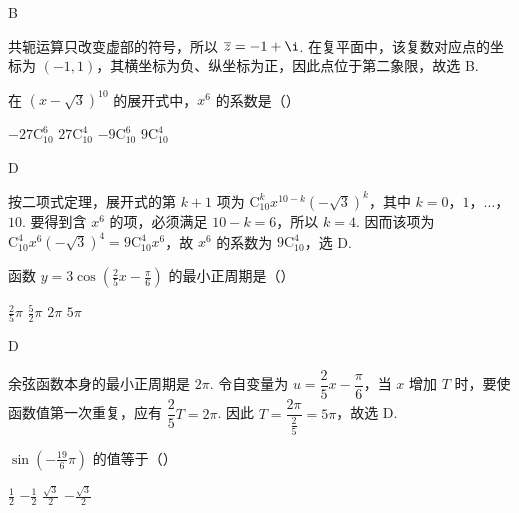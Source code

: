 \documentclass[UTF8,a4paper,oneside,11pt]{ctexbook}
\begin{document}
\begin{answer}
B
\end{answer}

\begin{solution}
共轭运算只改变虚部的符号，所以
\(\overline z=-1+\i\). 在复平面中，该复数对应点的坐标为 \((-1,1)\)，其横坐标为负、纵坐标为正，因此点位于第二象限，故选 B.
\end{solution}

\begin{problem}
在 \(\left(x-\sqrt{3}\right)^{10}\) 的展开式中，\(x^6\) 的系数是（\quad）

\choices
    {\(-27\mathrm C_{10}^6\)}
    {\(27\mathrm C_{10}^4\)}
    {\(-9\mathrm C_{10}^6\)}
    {\(9\mathrm C_{10}^4\)}
\end{problem}

\begin{answer}
D
\end{answer}

\begin{solution}
按二项式定理，展开式的第 \(k+1\) 项为
\(\mathrm C_{10}^k x^{10-k}\left(-\sqrt{3}\right)^k\)，其中 \(k=0\)，\(1\)，\(\ldots\)，\(10\). 要得到含 \(x^6\) 的项，必须满足 \(10-k=6\)，所以 \(k=4\). 因而该项为
\(\mathrm C_{10}^4x^6\left(-\sqrt{3}\right)^4=9\mathrm C_{10}^4x^6\)，故 \(x^6\) 的系数为 \(9\mathrm C_{10}^4\)，选 D.
\end{solution}

\begin{problem}
函数 \(y = 3\cos\left(\frac{2}{5}x-\frac{\pi}{6}\right)\) 的最小正周期是（\quad）

\choices
    {\(\frac{2}{5}\pi\)}
    {\(\frac{5}{2}\pi\)}
    {\(2\pi\)}
    {\(5\pi\)}
\end{problem}

\begin{answer}
D
\end{answer}

\begin{solution}
余弦函数本身的最小正周期是 \(2\pi\). 令自变量为
\(u=\dfrac25x-\dfrac\pi6\)，当 \(x\) 增加 \(T\) 时，要使函数值第一次重复，应有 \(\dfrac25T=2\pi\). 因此
\(T=\dfrac{2\pi}{\frac25}=5\pi\)，故选 D.
\end{solution}

\begin{problem}
\(\sin\left(-\frac{19}{6}\pi\right)\) 的值等于（\quad）

\choices
    {\(\frac{1}{2}\)}
    {\(-\frac{1}{2}\)}
    {\(\frac{\sqrt{3}}{2}\)}
    {\(-\frac{\sqrt{3}}{2}\)}
\end{problem}
\end{document}
